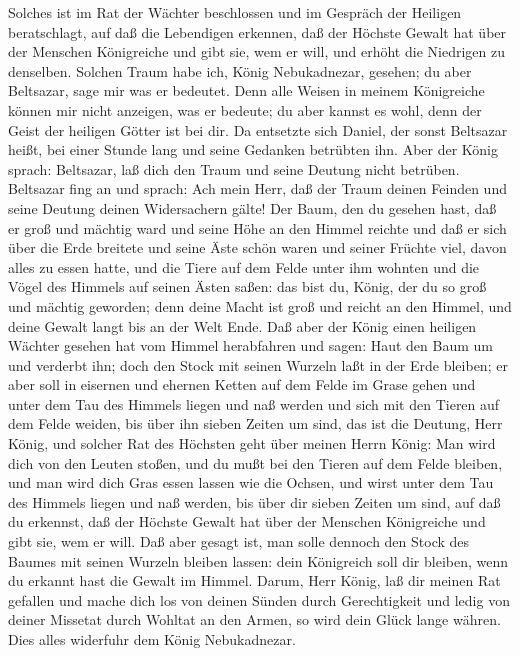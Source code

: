 Solches ist im Rat der Wächter beschlossen und im Gespräch der Heiligen
beratschlagt, auf daß die Lebendigen erkennen, daß der Höchste Gewalt
hat über der Menschen Königreiche und gibt sie, wem er will, und erhöht
die Niedrigen zu denselben.  Solchen Traum habe ich, König
Nebukadnezar, gesehen; du aber Beltsazar, sage mir was er bedeutet. Denn
alle Weisen in meinem Königreiche können mir nicht anzeigen, was er
bedeute; du aber kannst es wohl, denn der Geist der heiligen Götter ist
bei dir.  Da entsetzte sich Daniel, der sonst Beltsazar
heißt, bei einer Stunde lang und seine Gedanken betrübten ihn. Aber der
König sprach: Beltsazar, laß dich den Traum und seine Deutung nicht
betrüben. Beltsazar fing an und sprach: Ach mein Herr, daß der Traum
deinen Feinden und seine Deutung deinen Widersachern gälte!
 Der Baum, den du gesehen hast, daß er groß und mächtig
ward und seine Höhe an den Himmel reichte und daß er sich über die Erde
breitete  und seine Äste schön waren und seiner Früchte
viel, davon alles zu essen hatte, und die Tiere auf dem Felde unter ihm
wohnten und die Vögel des Himmels auf seinen Ästen saßen: 
das bist du, König, der du so groß und mächtig geworden; denn deine
Macht ist groß und reicht an den Himmel, und deine Gewalt langt bis an
der Welt Ende.  Daß aber der König einen heiligen Wächter
gesehen hat vom Himmel herabfahren und sagen: Haut den Baum um und
verderbt ihn; doch den Stock mit seinen Wurzeln laßt in der Erde
bleiben; er aber soll in eisernen und ehernen Ketten auf dem Felde im
Grase gehen und unter dem Tau des Himmels liegen und naß werden und sich
mit den Tieren auf dem Felde weiden, bis über ihn sieben Zeiten um sind,
 das ist die Deutung, Herr König, und solcher Rat des
Höchsten geht über meinen Herrn König:  Man wird dich von
den Leuten stoßen, und du mußt bei den Tieren auf dem Felde bleiben, und
man wird dich Gras essen lassen wie die Ochsen, und wirst unter dem Tau
des Himmels liegen und naß werden, bis über dir sieben Zeiten um sind,
auf daß du erkennst, daß der Höchste Gewalt hat über der Menschen
Königreiche und gibt sie, wem er will.  Daß aber gesagt
ist, man solle dennoch den Stock des Baumes mit seinen Wurzeln bleiben
lassen: dein Königreich soll dir bleiben, wenn du erkannt hast die
Gewalt im Himmel.  Darum, Herr König, laß dir meinen Rat
gefallen und mache dich los von deinen Sünden durch Gerechtigkeit und
ledig von deiner Missetat durch Wohltat an den Armen, so wird dein Glück
lange währen.  Dies alles widerfuhr dem König Nebukadnezar.
